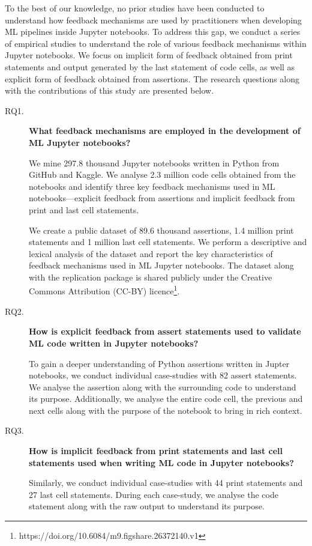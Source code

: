 \documentclass[smallextended]{svjour3}       %
\begin{document}
To the best of our knowledge, no prior studies have been conducted to understand how feedback mechanisms are used by practitioners when developing ML pipelines inside Jupyter notebooks. To address this gap, we conduct a series of empirical studies to understand the role of various feedback mechanisms within Jupyter notebooks. We focus on implicit form of feedback obtained from print statements and output generated by the last statement of code cells, as well as explicit form of feedback obtained from assertions. The research questions along with the contributions of this study are presented below.

\begin{description}
  \item[RQ1.] \textbf{What feedback mechanisms are employed in the development of ML Jupyter notebooks?}

    We mine 297.8 thousand Jupyter notebooks written in Python from GitHub and Kaggle. We analyse 2.3 million code cells obtained from the notebooks and identify three key feedback mechanisms used in ML notebooks---explicit feedback from assertions and implicit feedback from print and last cell statements.

    We create a public dataset of 89.6 thousand assertions, 1.4 million print statements and 1 million last cell statements. We perform a descriptive and lexical analysis of the dataset and report the key characteristics of feedback mechanisms used in ML Jupyter notebooks. The dataset along with the replication package is shared publicly under the Creative Commons Attribution (CC-BY) licence\footnote{https://doi.org/10.6084/m9.figshare.26372140.v1}.

  \item[RQ2.] \textbf{How is explicit feedback from assert statements used to validate ML code written in Jupyter notebooks?}

    To gain a deeper understanding of Python assertions written in Jupter notebooks, we conduct individual case-studies with 82 assert statements. We analyse the assertion along with the surrounding code to understand its purpose. Additionally, we analyse the entire code cell, the previous and next cells along with the purpose of the notebook to bring in rich context.

  \item[RQ3.] \textbf{How is implicit feedback from print statements and last cell statements used when writing ML code in Jupyter notebooks?}

    Similarly, we conduct individual case-studies with 44 print statements and 27 last cell statements. During each case-study, we analyse the code statement along with the raw output to understand its purpose.
\end{description}
\end{document}
